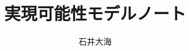 \qedsymbol{\ensuremath{\Box}}
\normalem


\makeatletter
\def\KVM#1{\KVM@init#1{\relax}}
\def\KVM@init#1#2{#1 \cons \KVM@rest#2}
\def\KVM@rest#1#2{%
\def\KVM@next{\KVM@rest{#1 \push #2}}
\ifx#2\relax
#1
\else
\expandafter\KVM@next
\fi
}
\makeatother

\title{実現可能性モデルノート}
\author{石井大海}

\usepackage{amssymb}	%
\usepackage{amsmath}	%
\usepackage[normalem]{ulem}	%

